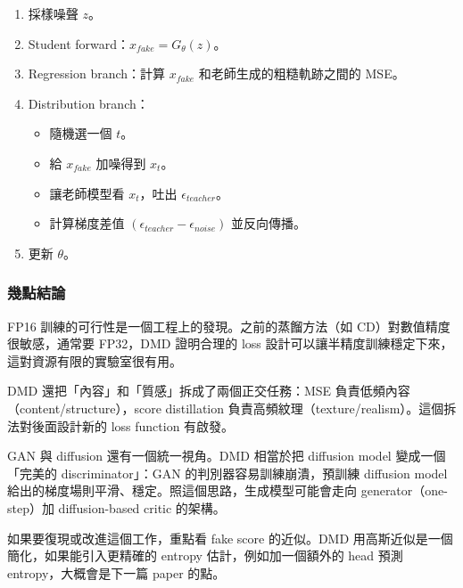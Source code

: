 \begin{enumerate}
  \item 採樣噪聲 \(z\)。
  \item Student forward：\(x_{fake} = G_\theta(z)\)。
  \item Regression branch：計算 \(x_{fake}\) 和老師生成的粗糙軌跡之間的 MSE。
  \item Distribution branch：
  
  \begin{itemize}
    \item 隨機選一個 \(t\)。
    \item 給 \(x_{fake}\) 加噪得到 \(x_t\)。
    \item 讓老師模型看 \(x_t\)，吐出 \(\epsilon_{teacher}\)。
    \item 計算梯度差值 \((\epsilon_{teacher} - \epsilon_{noise})\) 並反向傳播。
  \end{itemize}
  \item 更新 \(\theta\)。
\end{enumerate}

\subsubsection{幾點結論}

FP16 訓練的可行性是一個工程上的發現。之前的蒸餾方法（如 CD）對數值精度很敏感，通常要 FP32，DMD 證明合理的 loss 設計可以讓半精度訓練穩定下來，這對資源有限的實驗室很有用。

DMD 還把「內容」和「質感」拆成了兩個正交任務：MSE 負責低頻內容（content/structure），score distillation 負責高頻紋理（texture/realism）。這個拆法對後面設計新的 loss function 有啟發。

GAN 與 diffusion 還有一個統一視角。DMD 相當於把 diffusion model 變成一個「完美的 discriminator」：GAN 的判別器容易訓練崩潰，預訓練 diffusion model 給出的梯度場則平滑、穩定。照這個思路，生成模型可能會走向 generator（one-step）加 diffusion-based critic 的架構。

如果要復現或改進這個工作，重點看 fake score 的近似。DMD 用高斯近似是一個簡化，如果能引入更精確的 entropy 估計，例如加一個額外的 head 預測 entropy，大概會是下一篇 paper 的點。
